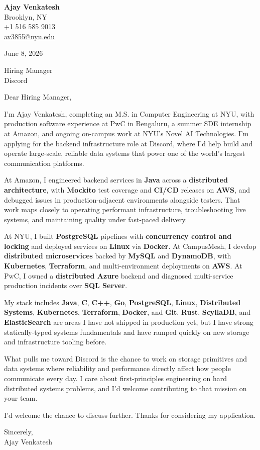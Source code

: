 \documentclass[letterpaper,11pt]{article}
\begin{document}
\begin{flushleft}
\textbf{\large Ajay Venkatesh} \\
Brooklyn, NY \\
+1 516 585 9013 \\
\href{mailto:av3855@nyu.edu}{av3855@nyu.edu}
\end{flushleft}
\vspace{10pt}
June 8, 2026
\vspace{6pt}

Hiring Manager \\
Discord

\vspace{10pt}

Dear Hiring Manager,

I'm Ajay Venkatesh, completing an M.S. in Computer Engineering at NYU, with production software experience at PwC in Bengaluru, a summer SDE internship at Amazon, and ongoing on-campus work at NYU's Novel AI Technologies. I'm applying for the backend infrastructure role at Discord, where I'd help build and operate large-scale, reliable data systems that power one of the world's largest communication platforms.

At Amazon, I engineered backend services in \textbf{Java} across a \textbf{distributed architecture}, with \textbf{Mockito} test coverage and \textbf{CI/CD} releases on \textbf{AWS}, and debugged issues in production-adjacent environments alongside testers. That work maps closely to operating performant infrastructure, troubleshooting live systems, and maintaining quality under fast-paced delivery.

At NYU, I built \textbf{PostgreSQL} pipelines with \textbf{concurrency control and locking} and deployed services on \textbf{Linux} via \textbf{Docker}. At CampusMesh, I develop \textbf{distributed microservices} backed by \textbf{MySQL} and \textbf{DynamoDB}, with \textbf{Kubernetes}, \textbf{Terraform}, and multi-environment deployments on \textbf{AWS}. At PwC, I owned a \textbf{distributed Azure} backend and diagnosed multi-service production incidents over \textbf{SQL Server}.

My stack includes \textbf{Java}, \textbf{C}, \textbf{C++}, \textbf{Go}, \textbf{PostgreSQL}, \textbf{Linux}, \textbf{Distributed Systems}, \textbf{Kubernetes}, \textbf{Terraform}, \textbf{Docker}, and \textbf{Git}. \textbf{Rust}, \textbf{ScyllaDB}, and \textbf{ElasticSearch} are areas I have not shipped in production yet, but I have strong statically-typed systems fundamentals and have ramped quickly on new storage and infrastructure tooling before.

What pulls me toward Discord is the chance to work on storage primitives and data systems where reliability and performance directly affect how people communicate every day. I care about first-principles engineering on hard distributed systems problems, and I'd welcome contributing to that mission on your team.

I'd welcome the chance to discuss further. Thanks for considering my application.

\vspace{12pt}
Sincerely, \\
Ajay Venkatesh
\end{document}
